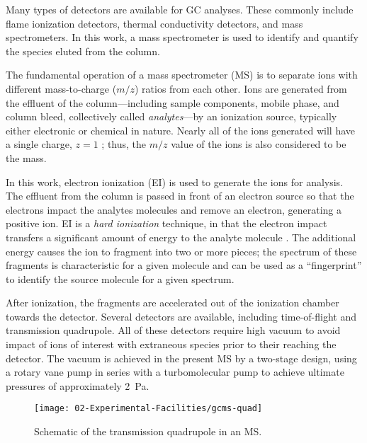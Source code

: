 \documentclass[../main.tex]{subfiles}
\begin{document}
Many types of detectors are available for GC analyses. These commonly include
flame ionization detectors, thermal conductivity detectors, and mass
spectrometers. In this work, a mass spectrometer is used to identify and
quantify the species eluted from the column.

The fundamental operation of a mass spectrometer (MS) is to separate ions with
different mass-to-charge ($m/z$) ratios from each other. Ions are generated
from the effluent of the column---including sample components, mobile phase,
and column bleed, collectively called \textit{analytes}---by an ionization source,
typically either electronic or chemical in nature. Nearly all of the ions
generated will have a single charge, $z=1$ \cite{Sparkman2011}; thus,
the $m/z$ value of the ions is also considered to be the mass.

In this work, electron ionization (EI) is used to generate the ions for
analysis. The effluent from the column is passed in front of an electron
source so that the electrons impact the analytes molecules and remove an
electron, generating a positive ion. EI is a \textit{hard ionization}
technique, in that the electron impact transfers a significant amount of energy
to the analyte molecule \cite{Sparkman2011}. The additional energy causes
the ion to fragment into two or more pieces; the spectrum of these fragments
is characteristic for a given molecule and can be used as a ``fingerprint''
to identify the source molecule for a given spectrum.

After ionization, the fragments are accelerated out of the ionization
chamber towards the detector. Several detectors are available, including
time-of-flight and transmission quadrupole. All of these detectors require
high vacuum to avoid impact of ions of interest with extraneous species
prior to their reaching the detector. The vacuum is achieved in the present
MS by a two-stage design, using a rotary vane pump in series with a
turbomolecular pump to achieve ultimate pressures of approximately \SI{2}{\pascal}.

\begin{figure}
\texttt{[image: 02-Experimental-Facilities/gcms-quad]}
\caption{Schematic of the transmission quadrupole in an MS.}
\label{fig:gcms-quad}
\end{figure}
\end{document}
